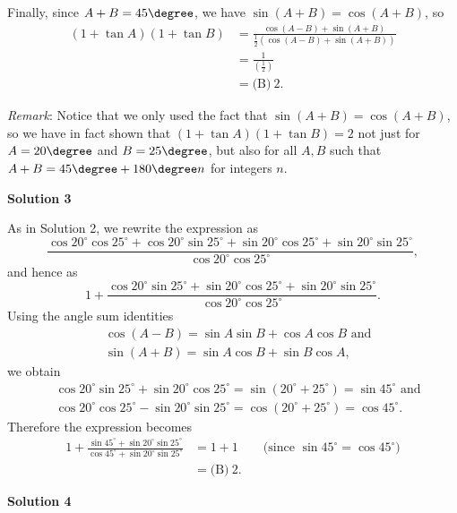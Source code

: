 \begin{enumerate}
 Finally, since $ A+B = 45 \degree$, we have $\sin(A+B) = \cos(A+B)$, so
 \begin{align*}\left(1+\tan A\right)\left(1+\tan B\right) &= \frac{\cos(A-B)+\sin(A+B)}{\frac{1}{2}\left(\cos(A-B)+\sin(A+B)\right)} \\ &= \frac{1}{\left(\frac{1}{2}\right)} \\ &= \boxed{\text{(B)} \ 2}.\end{align*}


 \textit{Remark}: Notice that we only used the fact that $\sin(A+B) = \cos(A+B)$, so we have in fact shown that $\left(1+\tan A\right)\left(1+\tan B\right) = 2$ not just for $ A = 20 \degree$ and $ B = 25 \degree$, but also for all $A,B$ such that $ A+B = 45 \degree + 180 \degree n$ for integers $n$.

 



\textbf{Solution 3}

As in Solution 2, we rewrite the expression as 
 \[\frac{\cos 20^{\circ} \cos 25^{\circ} + \cos 20^{\circ} \sin 25^{\circ} + \sin 20^{\circ} \cos 25^{\circ} + \sin 20^{\circ} \sin 25^{\circ}}{\cos 20^{\circ} \cos 25^{\circ}},\] and hence as 
 \[1 + \frac{\cos 20^{\circ} \sin 25^{\circ} + \sin 20^{\circ} \cos 25^{\circ} + \sin 20^{\circ} \sin 25^{\circ}}{\cos 20^{\circ} \cos 25^{\circ}}.\] Using the angle sum identities 
 \begin{align*}&\cos(A-B) = \sin A\sin B+\cos A\cos B \text{ and} \\ &\sin(A+B)=\sin A\cos B+\sin B\cos A,\end{align*}
 we obtain 
 \begin{align*}&\cos 20^{\circ} \sin 25^{\circ} + \sin 20^{\circ} \cos 25^{\circ} = \sin\left(20^{\circ}+25^{\circ}\right) = \sin 45^{\circ} \text{ and} \\ &\cos 20^{\circ} \cos 25^{\circ} - \sin 20^{\circ} \sin 25^{\circ} = \cos\left(20^{\circ}+25^{\circ}\right) = \cos 45^{\circ}.\end{align*}
 Therefore the expression becomes 
 \begin{align*}1+\frac{\sin 45^{\circ} + \sin 20^{\circ} \sin 25^{\circ}}{\cos 45^{\circ} + \sin 20^{\circ} \sin 25^{\circ}} &= 1+1 \qquad \text{(since } \sin 45^{\circ} = \cos 45^{\circ}\text{)} \\ &= \boxed{\text{(B)} \ 2}.\end{align*}





\textbf{Solution 4}


\end{enumerate}
